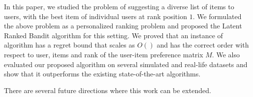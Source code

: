 In this paper, we studied the problem of suggesting a diverse list of items to users, with the best item of individual users at rank position $1$. We formulated the above problem as a personalized ranking problem and proposed the Latent Ranked Bandit algorithm for this setting. We proved that an instance of algorithm has  a regret bound that scales as $O\left( \right)$ and has the correct order with respect to user, items and rank of the user-item preference matrix $M$. We also evaluated our proposed algorithm on several simulated and real-life datasets and show that it outperforms the existing state-of-the-art algorithms.

There are several future directions where this work can be extended. 